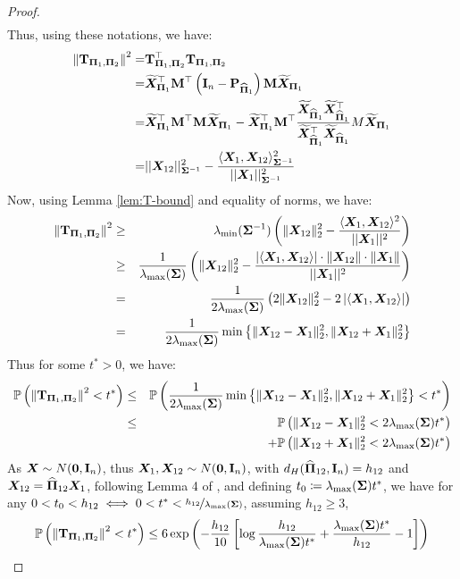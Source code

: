 \documentclass[numsec,webpdf,modern,medium,namedate]{oup-authoring-template}
\theoremstyle{thmstyleone}%
\theoremstyle{thmstyletwo}%
\theoremstyle{thmstylethree}%
\begin{document}
\begin{proof}
$$\begin{aligned}
\end{aligned}
$$
Thus, using these notations, we have:
\begin{equation}
    \begin{split}
        \left\|\mathbf{T}_{\boldsymbol{\Pi}_1, \boldsymbol{\Pi}_2} \right\|^2 = & \mathbf{T}_{\boldsymbol{\Pi}_1, \boldsymbol{\Pi}_2}^\top \mathbf{T}_{\boldsymbol{\Pi}_1, \boldsymbol{\Pi}_2}\\
        = & \widetilde{\boldsymbol{X}}^\top_{\boldsymbol{\Pi}_1}\mathbf{M}^\top\left(\mathbf{I}_n - \mathbf{P}_{\widehat{\boldsymbol{\Pi}}_1}\right)\mathbf{M}\widetilde{\boldsymbol{X}}_{\boldsymbol{\Pi}_1}\\
        = & \widetilde{\boldsymbol{X}}^\top_{\boldsymbol{\Pi}_1}\mathbf{M}^\top \mathbf{M}\widetilde{\boldsymbol{X}}_{\boldsymbol{\Pi}_1} - \widetilde{\boldsymbol{X}}^\top_{\boldsymbol{\Pi}_1}\mathbf{M}^\top \frac{\widetilde{\boldsymbol{X}}_{\widehat{\boldsymbol{\Pi}}_1}\widetilde{\boldsymbol{X}}_{\widehat{\boldsymbol{\Pi}}_1}^\top}{\widetilde{\boldsymbol{X}}_{\widehat{\boldsymbol{\Pi}}_1}^\top \widetilde{\boldsymbol{X}}_{\widehat{\boldsymbol{\Pi}}_1}}M\widetilde{\boldsymbol{X}}_{\boldsymbol{\Pi}_1}\\
        = &||\boldsymbol{X}_{12}||^2_{\boldsymbol{\Sigma}^{-1}} - \frac{\langle \boldsymbol{X}_{1}, \boldsymbol{X}_{12}\rangle^2_{\boldsymbol{\Sigma}^{-1}}}{||\boldsymbol{X}_1||^2_{\boldsymbol{\Sigma}^{-1}}}\\
    \end{split}
\end{equation}
Now, using Lemma \ref{lem:T-bound} and equality of norms, we have:
\begin{eqnarray*}
    \left\|\mathbf{T}_{\boldsymbol{\Pi}_1, \boldsymbol{\Pi}_2} \right\|^2 & \geq & \lambda_{\min}(\boldsymbol{\Sigma}^{-1})\left(\|\boldsymbol{X}_{12}\|_2^2 - \frac{\langle \boldsymbol{X}_{1}, \boldsymbol{X}_{12}\rangle^2}{||\boldsymbol{X}_1||^2}\right)\\
    & \geq & \dfrac{1}{\lambda_{\max}(\boldsymbol{\Sigma})}\left(\|\boldsymbol{X}_{12}\|_2^2 - \frac{\left|\langle \boldsymbol{X}_{1}, \boldsymbol{X}_{12}\rangle\right| \cdot \|\boldsymbol{X}_{12}\|\cdot \|\boldsymbol{X}_1\|}{||\boldsymbol{X}_1||^2}\right)\\
    & = & \dfrac{1}{2\lambda_{\max}(\boldsymbol{\Sigma})}\left(2\|\boldsymbol{X}_{12}\|_2^2 -2\left|\langle \boldsymbol{X}_{1}, \boldsymbol{X}_{12}\rangle\right|\right)\\
    & = & \dfrac{1}{2\lambda_{\max}(\boldsymbol{\Sigma})}\min \left\{\|\boldsymbol{X}_{12} - \boldsymbol{X}_1\|^2_2,\|\boldsymbol{X}_{12} + \boldsymbol{X}_1\|^2_2 \right\}
\end{eqnarray*}
Thus for some $t^\ast > 0$, we have:
\begin{eqnarray*}
    \mathbb{P}\left(\left\|\mathbf{T}_{\boldsymbol{\Pi}_1, \boldsymbol{\Pi}_2} \right\|^2 < t^\ast\right) & \leq & \mathbb{P}\left(\dfrac{1}{2\lambda_{\max}(\boldsymbol{\Sigma})}\min \left\{\|\boldsymbol{X}_{12} - \boldsymbol{X}_1\|^2_2,\|\boldsymbol{X}_{12} + \boldsymbol{X}_1\|^2_2 \right\} < t^\ast\right)\\
    & \leq & \mathbb{P}\left(\|\boldsymbol{X}_{12} - \boldsymbol{X}_1\|^2_2 < 2\lambda_{\max}(\boldsymbol{\Sigma})t^\ast\right)\\
    && + \mathbb{P}\left(\|\boldsymbol{X}_{12} + \boldsymbol{X}_1\|^2_2 < 2\lambda_{\max}(\boldsymbol{\Sigma})t^\ast\right)
\end{eqnarray*}
As $\boldsymbol{X} \sim N(\boldsymbol{0},\mathbf{I}_n)$, thus $\boldsymbol{X}_1, \boldsymbol{X}_{12} \sim N(\boldsymbol{0},\mathbf{I}_n)$, with $d_H(\widehat{\boldsymbol{\Pi}}_{12},\mathbf{I}_n) = h_{12}$ and $\boldsymbol{X}_{12} = \widehat{\boldsymbol{\Pi}}_{12}\boldsymbol{X}_1$, following Lemma 4 of  \cite{pananjady2017linear}, and defining $t_0 \coloneqq \lambda_{\max}(\boldsymbol{\Sigma})t^\ast$, we have for any $0 < t_0 < h_{12} \iff 0 < t^\ast < \nicefrac{h_{12}}{\lambda_{\max}(\boldsymbol{\Sigma})}$, assuming $h_{12} \geq 3$,
\begin{eqnarray*}
    \mathbb{P}\left(\left\|\mathbf{T}_{\boldsymbol{\Pi}_1, \boldsymbol{\Pi}_2} \right\|^2 < t^\ast\right) \leq 6 \exp\left(-\frac{h_{12}}{10}\left[\log \frac{h_{12}}{\lambda_{\max}(\boldsymbol{\Sigma})t^\ast} + \dfrac{\lambda_{\max}(\boldsymbol{\Sigma})t^\ast}{h_{12}} -1\right]\right)
\end{eqnarray*}
\end{proof}
\end{document}
